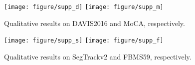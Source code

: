 \newpage


\newpage
\begin{figure*}[!htb]
\texttt{[image: figure/supp\_d]}
\texttt{[image: figure/supp\_m]}
\centering
\caption{Qualitative results on DAVIS2016 and MoCA, respectively.}
\label{fig:supp}
\end{figure*}



\begin{figure*}[!htb]
\texttt{[image: figure/supp\_s]}
\texttt{[image: figure/supp\_f]}
\centering
\caption{Qualitative results on SegTrackv2 and FBMS59, respectively.}
\label{fig:supp2}
\end{figure*}
